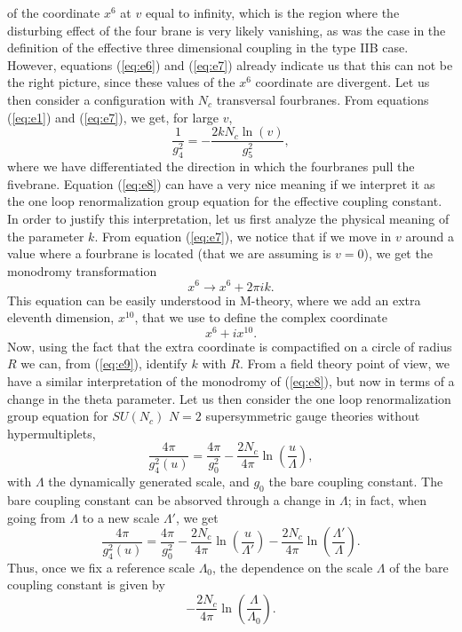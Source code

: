of the coordinate $x^6$ at $v$ equal to infinity, which is the
region where the disturbing effect of the four brane is very
likely vanishing, as was the case in the definition of the
effective three dimensional coupling in the type IIB case. 
However, equations (\ref{eq:e6}) and (\ref{eq:e7})
already indicate us that this can not be the right picture, since
these values of the $x^6$ coordinate are divergent. Let us
then consider a configuration with $N_c$ transversal
fourbranes. From equations
(\ref{eq:e1}) and (\ref{eq:e7}), we get, for large $v$,
\begin{equation}
\frac {1}{g_4^2} = - \frac {2 k N_c \ln (v)}{g_5^2},
\label{eq:e8}
\end{equation}
where we have differentiated the direction in which the
fourbranes pull the fivebrane. Equation (\ref{eq:e8}) can have a
very nice meaning if we interpret it as the one loop
renormalization group equation for the effective coupling
constant. In order to justify this interpretation, let us first
analyze the physical meaning of the parameter $k$. From equation
(\ref{eq:e7}), we notice that if we move in $v$ around a value
where a fourbrane is located (that we are assuming is $v=0$), we
get the monodromy transformation
\begin{equation}
x^6 \rightarrow x^6 + 2 \pi i k.
\label{eq:e9}
\end{equation}
This equation can be easily understood in M-theory, where we add
an extra eleventh dimension, $x^{10}$, that we use to define the
complex coordinate
\begin{equation}
x^6+ix^{10}.
\label{eq:e10}
\end{equation}
Now, using the fact that the extra coordinate is compactified on
a circle of radius $R$ we can, from (\ref{eq:e9}), identify $k$
with $R$. From a field theory point of view, we have a similar
interpretation of the monodromy of (\ref{eq:e8}), but now in
terms of a change in the theta parameter. Let us then consider
the one loop renormalization group equation 
for $SU(N_c)$ $N=2$ supersymmetric gauge theories without hypermultiplets,
\begin{equation}
\frac {4 \pi}{g_4^2(u)} = \frac {4\pi}{g_0^2} - \frac {2 N_c}{4 \pi} \ln 
\left( \frac {u}{\Lambda} \right),
\label{eq:e11}
\end{equation}
with $\Lambda$ the dynamically generated scale, and $g_0$ the
bare coupling constant. The bare coupling constant can be
absorved through a change in $\Lambda$; in fact, when going from
$\Lambda$ to a new scale $\Lambda'$, we get
\begin{equation}
\frac {4 \pi}{g_4^2(u)} = \frac {4\pi}{g_0^2} - \frac {2 N_c}{4 \pi} \ln 
\left( \frac {u}{\Lambda'} \right) - \frac {2 N_c}{4 \pi} \ln 
\left( \frac {\Lambda'}{\Lambda} \right).
\end{equation}
Thus, once we fix a reference scale $\Lambda_0$, the dependence
on the scale $\Lambda$ of the bare coupling constant is given by
\begin{equation}
- \frac {2 N_c}{4 \pi} \ln 
\left( \frac {\Lambda}{\Lambda_0} \right).
\label{beta}
\end{equation}
  
